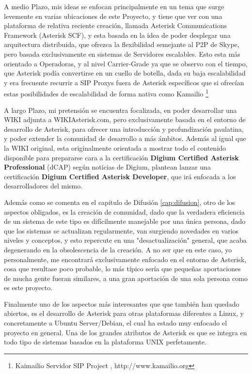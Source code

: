 A medio Plazo, mis ideas se enfocan principalmente en un tema que surge levemente en varias ubicaciones de este Proyecto, y tiene que ver con una plataforma de relativa reciente creación, llamada Asterisk Communications Framework (Asterisk SCF), y esta basada en la idea de poder desplegar una arquitectura distribuida, que ofrezca la flexibilidad semejante al P2P de Skype, pero basada exclusivamente en sistemas de Servidores escalables. Esto esta más orientado a Operadoras, y al nivel Carrier-Grade ya que se observo con el tiempo, que Asterisk podía convertirse en un cuello de botella, dada su baja escalabilidad y era frecuente recurrir a SIP Proxys fuera de Asterisk específicos que si ofrecían estas posibilidades de escalabilidad de forma nativa como Kamailio \footnote{Kaimailio Servidor SIP Project , http://www.kamailio.org}

A largo Plazo, mi pretensión se encuentra focalizada, en poder desarrollar una WIKI adjunta a WIKIAsterisk.com, pero exclusivamente basada en el entorno de desarrollo de Asterisk, para ofrecer una introducción y profundización paulatina, y poder extender la comunidad de desarrollo a más ámbitos. Además al igual que la WIKI original, esta originalmente orientada a mostrar todo el contenido disponible para prepararse cara a la certificación \textbf{Digium Certified Asterisk Professional} (dCAP) según noticias de Digium, plantean lanzar una certificación \textbf{Digium Certified Asterisk Developer}, que irá enfocada a los desarrolladores del mismo.

Además como se comenta en el capitulo de Difusión \ref{cap:difusion}, otro de los aspectos obligados, es la creación de comunidad, dado que la verdadera eficiencia de un sistema de este tipo es difícilmente manejable por una única persona, dado que los sistemas se actualizan regularmente, van surgiendo novedades en varios niveles y conceptos, y esto repercute en una "desactualización" general, que acaba degenerando en la obsolescencia de la creación. A no ser que en este caso, yo personalmente, me encontrará exclusivamente enfocado en el entorno de Asterisk, cosa que resultase poco probable, lo más típico sería que pequeñas aportaciones de mucha gente fueran similares, a una gran aportación de una sola persona como es este proyecto.

Finalmente uno de los aspectos más interesantes que que también han quedado abiertos, es el desarrollo de Asterisk para otras plataformas diferentes a Linux, y concretamente a Ubuntu Server/Debian, el cual ha estado muy enfocado el proyecto en general. Una de los grandes atributos de Asterisk es que se integra en todo tipo de sistemas basados en la plataforma UNIX perfetamente.